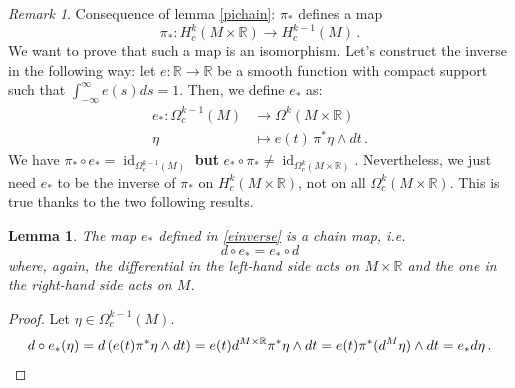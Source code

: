 \documentclass[a4paper,11pt,titlepage, article, oneside]{memoir}
\numberwithin{equation}{section}
\newtheorem{lemma}[theorem]{Lemma}
\theoremstyle{definition}
\theoremstyle{remark}
\newtheorem{remark}[theorem]{Remark}
\DeclareMathOperator{\id}{id}
\newcommand{\rfield}{\mathbb{R}}
\begin{document}
\begin{remarkbox}
\begin{remark}
Consequence of lemma \ref{pichain}: $\pi_*$ defines a map
\[ \pi_* \colon H_c^k(M \times \rfield) \rightarrow H^{k-1}_c(M) \, . \]
We want to prove that such a map is an isomorphism. Let's construct the inverse in the following way: let $e \colon \rfield \rightarrow \rfield$ be a smooth function with compact support  such that $\int_{-\infty}^{\infty} e(s) ds = 1$. Then, we define $e_*$ as:
\begin{align} \label{einverse}
e_* \colon \Omega^{k-1}_c (M) &\rightarrow \Omega^k(M \times \rfield) \\
\eta &\mapsto e(t) \, \pi^*\eta \wedge dt \, . \nonumber
\end{align}
We have $\pi_* \circ e_* = \id_{\Omega_c^{k-1}(M)}$ \textbf{but} $e_* \circ \pi_* \not = \id_{\Omega_c^k(M \times \rfield)}$. Nevertheless, we just need $e_*$ to be the inverse of $\pi_*$ on $H_c^k(M \times \rfield)$, not on all $\Omega^k_c(M \times \rfield)$. This is true thanks to the two following results.
\end{remark}
\end{remarkbox}

\begin{lemma}
The map $e_*$ defined in \eqref{einverse} is a chain map, i.e.
\begin{equation}
d \circ e_* = e_* \circ d
\end{equation}
where, again, the differential in the left-hand side acts on $M \times \rfield$ and the one in the right-hand side acts on $M$.
\end{lemma}
\begin{proof} 
Let $\eta \in \Omega^{k-1}_c(M)$.
\begin{equation*}
d \circ e_*(\eta) = d \left ( e(t)  \pi^*\eta \wedge dt \right ) = e(t) d^{M \times \rfield} \pi^*\eta \wedge dt = e(t) \pi^*(d^M \eta) \wedge dt = e_* d \eta \, . \qedhere
\end{equation*}
\end{proof}
\end{document}
